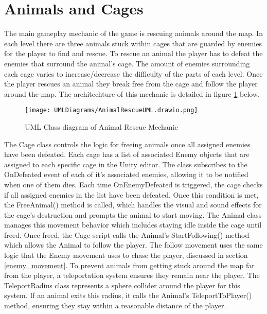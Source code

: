 \documentclass[]{final_report}
\begin{document}
\section{Animals and Cages}
\color{red} The main gameplay mechanic of the game is rescuing animals around the map. In each level there are three animals stuck within cages that are guarded by enemies for the player to find and rescue. To rescue an animal the player has to defeat the enemies that surround the animal's cage. The amount of enemies surrounding each cage varies to increase/decrease the difficulty of the parts of each level. Once the player rescues an animal they break free from the cage and follow the player around the map. The architechture of this mechanic is detailed in figure \ref{fig:label_rescue} below. 
\begin{figure}[H]
    \centering
    \texttt{[image: UMLDiagrams/AnimalRescueUML.drawio.png]}
    \caption{UML Class diagram of Animal Rescue Mechanic}
    \label{fig:label_rescue}
\end{figure}
The Cage class controls the logic for freeing animals once all assigned enemies have been defeated. Each cage has a list of associated Enemy objects that are assigned to each specific cage in the Unity editor. The class subscribes to the OnDefeated event of each of it's associated enemies, allowing it to be notified when one of them dies. Each time OnEnemyDefeated is triggered, the cage checks if all assigned enemies in the list have been defeated. Once this condition is met, the FreeAnimal() method is called, which handles the visual and sound effects for the cage's destruction and prompts the animal to start moving. The Animal class manages this movement behavior which includes staying idle inside the cage until freed. Once freed, the Cage script calls the Animal's StartFollowing() method which allows the Animal to follow the player. The follow movement uses the same logic that the Enemy movement uses to chase the player, discussed in section \ref{enemy_movement}. To prevent animals from getting stuck around the map far from the player, a teleportation system ensures they remain near the player. The TeleportRadius class represents a sphere collider around the player for this system. If an animal exits this radius, it calls the Animal's TeleportToPlayer() method, ensuring they stay within a reasonable distance of the player.
\color{black}


\end{document}

